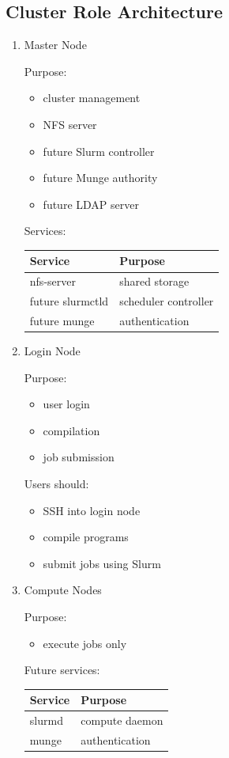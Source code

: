 \documentclass[11pt]{article}
\begin{document}
\subsection{Cluster Role Architecture}
\label{sec:orgcb3848f}
\begin{enumerate}
\item Master Node
\label{sec:org33382f8}

Purpose:

\begin{itemize}
\item cluster management
\item NFS server
\item future Slurm controller
\item future Munge authority
\item future LDAP server
\end{itemize}

Services:

\begin{center}
\begin{tabular}{ll}
Service & Purpose\\
\hline
nfs-server & shared storage\\
future slurmctld & scheduler controller\\
future munge & authentication\\
\end{tabular}
\end{center}
\item Login Node
\label{sec:org4105395}

Purpose:

\begin{itemize}
\item user login
\item compilation
\item job submission
\end{itemize}

Users should:
\begin{itemize}
\item SSH into login node
\item compile programs
\item submit jobs using Slurm
\end{itemize}
\item Compute Nodes
\label{sec:org1b90fb5}

Purpose:

\begin{itemize}
\item execute jobs only
\end{itemize}

Future services:

\begin{center}
\begin{tabular}{ll}
Service & Purpose\\
\hline
slurmd & compute daemon\\
munge & authentication\\
\end{tabular}
\end{center}
\end{enumerate}
\end{document}
